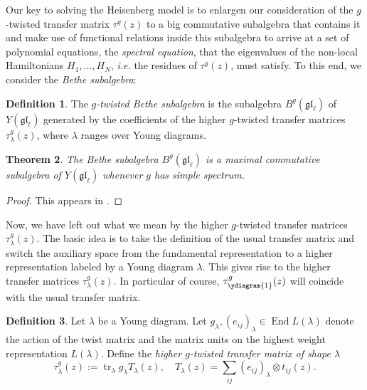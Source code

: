 \documentclass[11pt]{report}
\newtheorem{theorem}{Theorem}[section]
\theoremstyle{definition}
\newtheorem{definition}[theorem]{Definition}
\theoremstyle{remark}
\theoremstyle{remark}
\begin{document}
Our key to solving the Heisenberg model is to enlargen our consideration of the $g$-twisted transfer matrix $\tau^g(z)$ to a big commutative subalgebra that contains it and make use of functional relations inside this subalgebra to arrive at a set of polynomial equations, the \emph{spectral equation}, that the eigenvalues of the non-local Hamiltonians $H_1,...,H_N$, \emph{i.e.} the residues of $\tau^g(z)$, must satisfy. To this end, we consider the \emph{Bethe subalgebra}:

\begin{definition}
The \emph{$g$-twisted Bethe subalgebra} is the subalgebra $B^g(\mathfrak{gl}_\ell)$ of $Y(\mathfrak{gl}_\ell)$ generated by the coefficients of the higher $g$-twisted transfer matrices $\tau_\lambda^g(z)$, where $\lambda$ ranges over Young diagrams.
\end{definition}

\begin{theorem}
The Bethe subalgebra $B^g(\mathfrak{gl}_\ell)$ is a maximal commutative subalgebra of $Y(\mathfrak{gl}_\ell)$ whenever $g$ has simple spectrum.
\end{theorem}

\begin{proof}
This appears in \cite{article:nazarov:1996}.
\end{proof}

Now, we have left out what we mean by the higher $g$-twisted transfer matrices $\tau_\lambda^g(z)$. The basic idea is to take the definition of the usual transfer matrix and switch the auxiliary space from the fundamental representation to a higher representation labeled by a Young diagram $\lambda$. This gives rise to the higher transfer matrices $\tau_\lambda^g(z)$. In particular of course, $\tau_{\ydiagram{1}}^g(z)$ will coincide with the usual transfer matrix.

\begin{definition}
Let $\lambda$ be a Young diagram. Let $g_\lambda,(e_{ij})_\lambda \in \operatorname{End} L(\lambda)$ denote the action of the twist matrix and the matrix units on the highest weight representation $L(\lambda)$. Define the \emph{higher $g$-twisted transfer matrix of shape $\lambda$}
\begin{equation*}
\tau_\lambda^g(z) := \operatorname{tr}_\lambda g_\lambda T_\lambda(z), \quad T_\lambda(z) = \sum_{ij} (e_{ij})_\lambda \otimes t_{ij}(z).
\end{equation*}
\end{definition}
\end{document}
